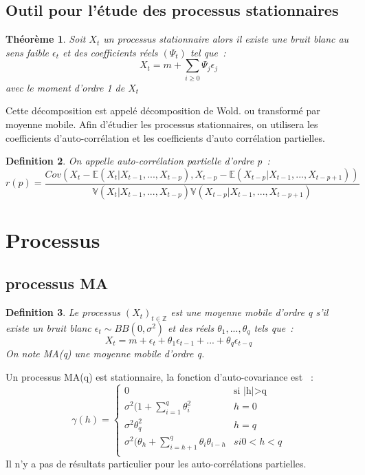 \documentclass[11pt]{scrartcl} %
\newtheorem{theorem}{Théorème}[section]
\newtheorem{Def}[theorem]{Definition}
\newcommand{\Xt}{\left(X_t\right)_{t\in\mathbb{Z}}}
\begin{document}
\subsection{Outil pour l'étude des processus stationnaires}
\begin{theorem}
Soit $X_t$ un processus stationnaire alors il existe une bruit blanc au sens faible $\epsilon_t$ et des coefficients réels $\left(\Psi_t\right)$ tel que~:
$$
X_t = m+\sum_{i\geq 0}\Psi_j\epsilon_j
$$
avec le moment d'ordre 1 de $X_t$
\end{theorem}
Cette décomposition est appelé décomposition de Wold. ou transformé par moyenne mobile.
Afin d'étudier les processus stationnaires, on utilisera les coefficients d'auto-corrélation et les coefficients d'auto corrélation partielles.
\begin{Def}
On appelle auto-corrélation partielle d'ordre p~:
$$
r(p)=\frac{Cov\left(X_t-\mathbb{E}\left(X_t|X_{t-1},...,X_{t-p}\right),X_{t-p}-\mathbb{E}\left(X_{t-p}|X_{t-1},...,X_{t-p+1}\right)\right)}{\mathbb{V}\left(X_t|X_{t-1},...,X_{t-p}\right)\mathbb{V}\left(X_{t-p}|X_{t-1},...,X_{t-p+1}\right)}
$$
\end{Def}

\section{Processus}
\subsection{processus MA}
\begin{Def}
Le processus $\Xt$ est une moyenne mobile d'ordre q s'il existe un bruit blanc $\epsilon_t\sim BB(0,\sigma^2)$ et des réels $\theta_1,...,\theta_q$ tels que~:~
$$
X_t=m+\epsilon_t+\theta_1\epsilon_{t-1}+...+\theta_q\epsilon_{t-q}
$$ 
On note MA(q) une moyenne mobile d'ordre q.
\end{Def}
Un processus MA(q) est stationnaire, la fonction d'auto-covariance est ~:
$$
\gamma(h)=\left\{\begin{array}{cc}
0 & \textrm{si |h|>q}\\
\sigma^2(1+\sum_{i=1}^q\theta^2_i & h=0\\
\sigma^2 \theta^2_q & h=q\\
\sigma^2(\theta_h+\sum_{i=h+1}^q\theta_i\theta_{i-h} & si 0<h<q\\
\end{array}
\right.
$$
Il n'y a pas de résultats particulier pour les auto-corrélations partielles.
\end{document}
